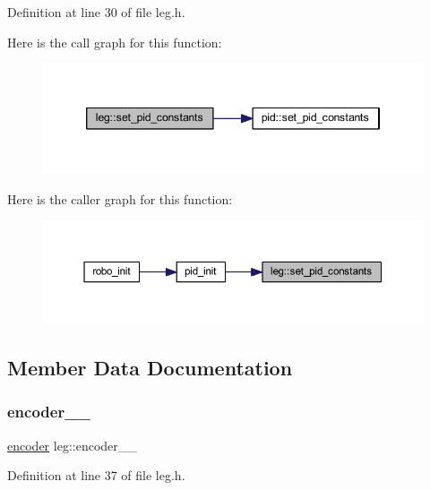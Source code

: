 Definition at line 30 of file leg.\+h.

Here is the call graph for this function\+:
\nopagebreak
\begin{figure}[H]
\begin{center}
\leavevmode
\includegraphics[width=346pt]{classleg_af28c31cfef29472bc1392af5ad48b97b_cgraph}
\end{center}
\end{figure}
Here is the caller graph for this function\+:
\nopagebreak
\begin{figure}[H]
\begin{center}
\leavevmode
\includegraphics[width=350pt]{classleg_af28c31cfef29472bc1392af5ad48b97b_icgraph}
\end{center}
\end{figure}


\subsection{Member Data Documentation}
\mbox{\label{classleg_af6548dbf60a17b49bb4e1da05d0fa933}} 
\subsubsection{\texorpdfstring{encoder\_\_}{encoder\_\_}}
{\footnotesize\ttfamily \mbox{\hyperlink{classencoder}{encoder}} leg\+::encoder\+\_\+\+\_\+\hspace{0.3cm}{\ttfamily [private]}}



Definition at line 37 of file leg.\+h.

\mbox{\label{classleg_a3c984e90c4004c8dae1e2723fc7eaf52}} 
